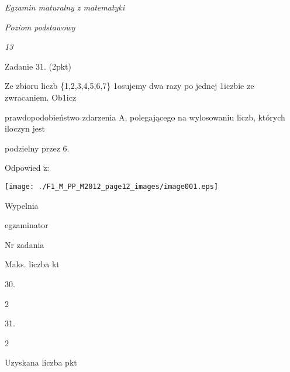 \documentclass[a4paper,12pt]{article}
\begin{document}
{\it Egzamin maturalny z matematyki}

{\it Poziom podstawowy}

{\it 13}

Zadanie 31. (2pkt)

Ze zbioru liczb \{1,2,3,4,5,6,7\} 1osujemy dwa razy po jednej 1iczbie ze zwracaniem. Ob1icz

prawdopodobieństwo zdarzenia A, polegającego na wylosowaniu liczb, których iloczyn jest

podzielny przez 6.

Odpowied $\acute{\mathrm{z}}$:
\begin{center}
\texttt{[image: ./F1\_M\_PP\_M2012\_page12\_images/image001.eps]}
\end{center}
Wypelnia

egzaminator

Nr zadania

Maks. liczba kt

30.

2

31.

2

Uzyskana liczba pkt
\end{document}

